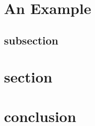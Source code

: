 \documentclass[12pt,letterpaper]{article}
\begin{document}
\section{An Example}



\subsection{subsection}


\section{section}

\section{conclusion}
         



\end{document}
